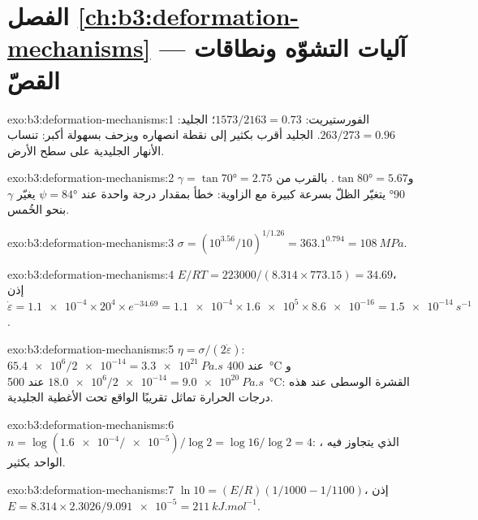 \section*{الفصل \ref{ch:b3:deformation-mechanisms} --- آليات التشوّه ونطاقات القصّ}

\begin{solution}{exo:b3:deformation-mechanisms:1}
الفورستيريت: $1573/2163 = 0.73$؛ الجليد: $263/273 = 0.96$. الجليد أقرب بكثير إلى
نقطة انصهاره ويزحف بسهولة أكبر: تنساب الأنهار الجليدية
على سطح الأرض.
\end{solution}

\begin{solution}{exo:b3:deformation-mechanisms:2}
$\gamma = \tan\ang{70} = 2.75$ و$\tan\ang{80} = 5.67$. بالقرب من \ang{90} يتغيّر الظلّ
بسرعة كبيرة مع الزاوية: خطأ بمقدار درجة واحدة عند $\psi =
\ang{84}$ يغيّر $\gamma$ بنحو الخُمس.
\end{solution}

\begin{solution}{exo:b3:deformation-mechanisms:3}
$\sigma = (10^{3.56}/10)^{1/1.26} = 363.1^{0.794} = \qty{108}{MPa}$.
\end{solution}

\begin{solution}{exo:b3:deformation-mechanisms:4}
$E/RT = 223000/(8.314\times773.15) = 34.69$، إذن $\dot\varepsilon =
\num{1.1e-4}\times20^4\times e^{-34.69} = \num{1.1e-4}\times\num{1.6e5}\times
\num{8.6e-16} = \qty{1.5e-14}{s^{-1}}$.
\end{solution}

\begin{solution}{exo:b3:deformation-mechanisms:5}
$\eta = \sigma/(2\dot\varepsilon)$: $\num{65.4e6}/\num{2e-14} =
\qty{3.3e21}{Pa.s}$ عند \qty{400}{\celsius} و$\num{18.0e6}/\num{2e-14} =
\qty{9.0e20}{Pa.s}$ عند \qty{500}{\celsius}: القشرة الوسطى عند هذه
درجات الحرارة تماثل تقريبًا  الواقع تحت الأغطية الجليدية.
\end{solution}

\begin{solution}{exo:b3:deformation-mechanisms:6}
$n = \log(\num{1.6e-4}/\num{e-5})/\log2 = \log16/\log2 = 4$: ،
الذي يتجاوز  فيه الواحد بكثير.
\end{solution}

\begin{solution}{exo:b3:deformation-mechanisms:7}
$\ln10 = (E/R)(1/1000 - 1/1100)$، إذن $E = 8.314\times2.3026/\num{9.091e-5} =
\qty{211}{kJ.mol^{-1}}$.
\end{solution}

